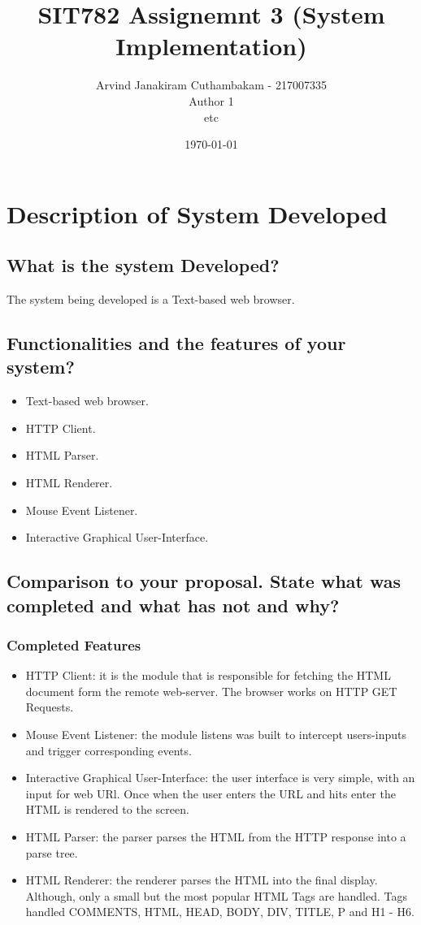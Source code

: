 \documentclass[11pt]{article}
\author{Arvind Janakiram Cuthambakam - 217007335 \\ Author 1 \\ etc}
\date{\today}
\title{SIT782 Assignemnt 3 (System Implementation)}
\begin{document}
\maketitle
\tableofcontents


\section{Description of System Developed}
\label{sec-1}

\subsection{What is the system Developed?}
\label{sec-1-1}
The system being developed is a Text-based web browser.

\subsection{Functionalities and the features of your system?}
\label{sec-1-2}
\begin{itemize}
\item Text-based web browser.
\item HTTP Client.
\item HTML Parser.
\item HTML Renderer.
\item Mouse Event Listener.
\item Interactive Graphical User-Interface.
\end{itemize}

\subsection{Comparison to your proposal. State what was completed and what has not and why?}
\label{sec-1-3}
\subsubsection{Completed Features}
\label{sec-1-3-1}
\begin{itemize}
\item HTTP Client: it is the module that is responsible for fetching the HTML document form the remote web-server. The browser works on HTTP GET Requests.
\item Mouse Event Listener: the module listens was built to intercept users-inputs and trigger corresponding events.
\item Interactive Graphical User-Interface: the user interface is very simple, with an input for web URl. Once when the user enters the URL and hits enter the HTML is rendered to the screen.
\item HTML Parser: the parser parses the HTML from the HTTP response into a parse tree.
\item HTML Renderer: the renderer parses the HTML into the final display. Although, only a small but the most popular HTML Tags are handled. Tags handled COMMENTS, HTML, HEAD, BODY, DIV, TITLE, P and H1 - H6.
\end{itemize}
\end{document}
